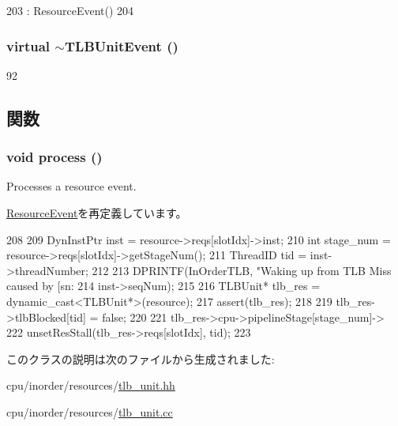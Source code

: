 \begin{DoxyCode}
203     : ResourceEvent()
204 { }
\end{DoxyCode}
\hypertarget{classTLBUnitEvent_aa511a582129d05f3f4a40993c209a237}{
\subsubsection[{$\sim$TLBUnitEvent}]{\setlength{\rightskip}{0pt plus 5cm}virtual $\sim${\bf TLBUnitEvent} ()}}
\label{classTLBUnitEvent_aa511a582129d05f3f4a40993c209a237}



\begin{DoxyCode}
92 {}
\end{DoxyCode}


\subsection{関数}
\hypertarget{classTLBUnitEvent_a2e9c5136d19b1a95fc427e0852deab5c}{
\subsubsection[{process}]{\setlength{\rightskip}{0pt plus 5cm}void process ()}}
\label{classTLBUnitEvent_a2e9c5136d19b1a95fc427e0852deab5c}
Processes a resource event. 

\hyperlink{classResourceEvent_a2e9c5136d19b1a95fc427e0852deab5c}{ResourceEvent}を再定義しています。


\begin{DoxyCode}
208 {
209     DynInstPtr inst = resource->reqs[slotIdx]->inst;
210     int stage_num = resource->reqs[slotIdx]->getStageNum();
211     ThreadID tid = inst->threadNumber;
212 
213     DPRINTF(InOrderTLB, "Waking up from TLB Miss caused by [sn:%
214             inst->seqNum);
215 
216     TLBUnit* tlb_res = dynamic_cast<TLBUnit*>(resource);
217     assert(tlb_res);
218 
219     tlb_res->tlbBlocked[tid] = false;
220 
221     tlb_res->cpu->pipelineStage[stage_num]->
222         unsetResStall(tlb_res->reqs[slotIdx], tid);
223 }
\end{DoxyCode}


このクラスの説明は次のファイルから生成されました:\begin{DoxyCompactItemize}
\item 
cpu/inorder/resources/\hyperlink{tlb__unit_8hh}{tlb\_\-unit.hh}\item 
cpu/inorder/resources/\hyperlink{tlb__unit_8cc}{tlb\_\-unit.cc}\end{DoxyCompactItemize}
